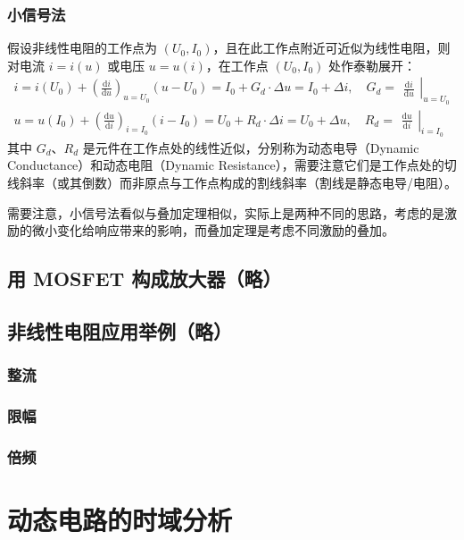 \documentclass[UTF8]{report}
\theoremstyle{MyLineTheoremStyle} %
\theoremstyle{MyBlockTheoremStyle} %
\theoremstyle{MySubsubsectionStyle} %
\begin{document}
\subsection{小信号法}
假设非线性电阻的工作点为 $(U_0, I_0)$，且在此工作点附近可近似为线性电阻，则对电流 $i = i(u)$ 或电压 $u = u(i)$，在工作点 $(U_0, I_0)$ 处作泰勒展开：
\begin{gather}
i = i(U_0) + \left(\frac{\mathrm{d} i}{\mathrm{d} u }\right)_{u=U_0}(u - U_0) = I_0 + G_d\cdot \Delta u = I_0 + \Delta i
,\quad 
G_d = 
\left.\begin{matrix}\displaystyle
    \frac{\mathrm{d} i}{\mathrm{d} u }
\end{matrix}\right|_{u=U_0}
\\
u = u(I_0) + \left(\frac{\mathrm{d} u}{\mathrm{d} i }\right)_{i=I_0}(i - I_0) = U_0 + R_d \cdot \Delta i = U_0 + \Delta u
,\quad 
R_d =
\left.\begin{matrix}\displaystyle
    \frac{\mathrm{d} u}{\mathrm{d} i }
\end{matrix}\right|_{i=I_0}
\end{gather}
其中 $G_d$、$R_d$ 是元件在工作点处的线性近似，分别称为动态电导（Dynamic Conductance）和动态电阻（Dynamic Resistance），需要注意它们是工作点处的切线斜率（或其倒数）而非原点与工作点构成的割线斜率（割线是静态电导/电阻）。

需要注意，小信号法看似与叠加定理相似，实际上是两种不同的思路，考虑的是激励的微小变化给响应带来的影响，而叠加定理是考虑不同激励的叠加。
\section{用 MOSFET 构成放大器（略）}

\section{非线性电阻应用举例（略）}
\subsection{整流}
\subsection{限幅}
\subsection{倍频}


\chapter{动态电路的时域分析}\thispagestyle{fancy}
\end{document}
